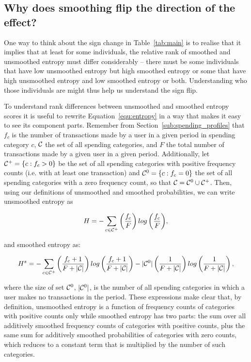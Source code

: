 \subsection{Why does smoothing flip the direction of the effect?}%
\label{sub:why_does_smoothing_flip_the_direction_of_the_effect}

One way to think about the sign change in Table~\ref{tab:main} is to realise
that it implies that at least for some individuals, the relative rank of
smoothed and unsmoothed entropy must differ considerably -- there must be some
individuals that have low unsmoothed entropy but high smoothed entropy or some
that have high unsmoothed entropy and low smoothed entropy or both.
Understanding who those individuals are might thus help us understand the sign
flip.

To understand rank differences between unsmoothed and smoothed entropy scores
it is useful to rewrite Equation~\ref{equ:entropy} in a way that makes it easy
to see its component parts. Remember from Section~\ref{sub:spending_profiles}
that $f_c$ is the number of transactions made by a user in a given period in
spending category $c$, $\mathcal{C}$ the set of all spending categories, and $F$ the
total number of transactions made by a given user in a given period.
Additionally, let $\mathcal{C}^{+} = \{c: f_c > 0\}$ be the set of all spending
categories with positive frequency counts (i.e.  with at least one transaction)
and $\mathcal{C}^{0} = \{c: f_c = 0\}$ the set of all spending categories with a zero
frequency count, so that $\mathcal{C} = \mathcal{C}^{0} \cup \mathcal{C}^{+}$. Then, using our
definitions of unsmoothed and smoothed probabilities, we can write unsmoothed
entropy as

\begin{equation}
\label{equ:entropy_us}
H = -\sum_{c \in \mathcal{C}^{+}}{\left(\frac{f_c}{F}\right)
log\left(\frac{f_c}{F}\right)},
\end{equation}

\noindent and smoothed entropy as:

\begin{equation}
\label{equ:entropy_s}
H^s = -\sum_{c \in \mathcal{C}^{+}}{\left(\frac{f_c + 1}{F + |\mathcal{C}|}\right)
log\left(\frac{f_c + 1}{F + |\mathcal{C}|}\right)}
- |\mathcal{C}^{0}|\left(\frac{1}{F + |\mathcal{C}|}\right)
log\left(\frac{1}{F + |\mathcal{C}|}\right),
\end{equation}

\noindent where the size of set $\mathcal{C}^{0}$, $|\mathcal{C}^{0}|$, is the number of all
spending categories in which a user makes no transactions in the period.
These expressions make clear that, by definition, unsmoothed entropy is a
function of frequency counts of categories with positive counts only while
smoothed entropy has two parts: the sum over all additively smoothed frequency
counts of categories with positive counts, plus the same sum for additively
smoothed probabilities of categories with zero counts, which reduces to a
constant term that is multiplied by the number of such categories.

